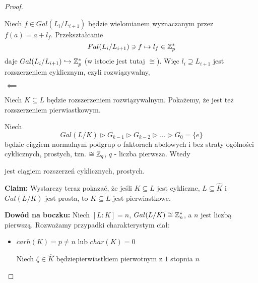 \begin{proof}
\begin{itemize}
    Niech $f\in Gal(L_i/L_{i+1})$ będzie wielomianem wyznaczanym przez $f(a)=a+l_f$. Przekształcanie
    $$Fal(L_i/L_{i+1})\ni f\mapsto l_f\in \mathbb{Z}_p^*$$
    daje $Gal(L_i/L_{i+1})\hookrightarrow\mathbb{Z}_p^*$ (w istocie jest tutaj $\cong$). Więc $l_i\supseteq L_{i+1}$ jest rozszerzeniem cyklicznym, czyli rozwiązywalny,
\end{itemize}

$\impliedby$

Niech $K\subseteq L$ będzie rozszerzeniem rozwiązywalnym. Pokażemy, że jest też rozszerzeniem pierwiastkowym.

Niech
$$Gal(L/K)\triangleright G_{k-1}\triangleright G_{k-2}\triangleright...\triangleright G_0=\{e\}$$
będzie ciągiem normalnym podgrup o faktorach abelowych i bez straty ogólności cyklicznych, prostych, tzn. $\cong\mathbb{Z}_q$, $q$ - liczba pierwsza. Wtedy
\begin{center}\end{center}
jest ciągiem rozszerzeń cyklicznych, prostych.

\textbf{Claim:} Wystarczy teraz pokazać, że jeśli $K\subseteq L$ jest cykliczne, $L\subseteq\hat{K}$ i $Gal(L/K)$ jest prosta, to $K\subseteq L$ jest pierwiastkowe.

\textbf{Dowód na boczku:} Niech $[L:K]=n$, $Gal(L/K)\cong\mathbb{Z}_n^*$, a $n$ jest liczbą pierwszą. Rozważamy przypadki charakterystym ciał:
\begin{itemize}
    \item $carh(K)=p\neq n$ lub $char(K)=0$

    Niech $\zeta\in\hat{K}$ będziepierwiastkiem pierwotnym z $1$ stopnia $n$
\end{itemize}
\end{proof}
